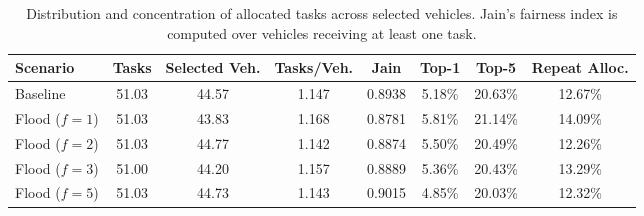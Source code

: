 \begin{table}[t]
\centering
\caption{Distribution and concentration of allocated tasks across selected vehicles. Jain's fairness index is computed over vehicles receiving at least one task.}
\label{tab:task_distribution}
\begin{tabular}{lccccccc}
\hline
Scenario & Tasks & Selected Veh. & Tasks/Veh. & Jain & Top-1 & Top-5 & Repeat Alloc. \\
\hline
Baseline & 51.03 & 44.57 & 1.147 & 0.8938 & 5.18\% & 20.63\% & 12.67\% \\
Flood ($f=1$) & 51.03 & 43.83 & 1.168 & 0.8781 & 5.81\% & 21.14\% & 14.09\% \\
Flood ($f=2$) & 51.03 & 44.77 & 1.142 & 0.8874 & 5.50\% & 20.49\% & 12.26\% \\
Flood ($f=3$) & 51.00 & 44.20 & 1.157 & 0.8889 & 5.36\% & 20.43\% & 13.29\% \\
Flood ($f=5$) & 51.03 & 44.73 & 1.143 & 0.9015 & 4.85\% & 20.03\% & 12.32\% \\
\hline
\end{tabular}
\end{table}